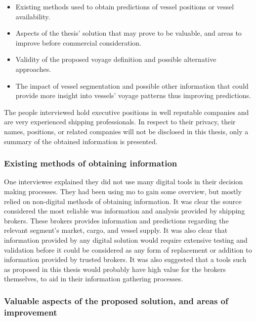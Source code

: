\begin{itemize}
    \item Existing methods used to obtain predictions of vessel positions or vessel availability.
    \item Aspects of the thesis' solution that may prove to be valuable, and areas to improve before commercial consideration.
    \item Validity of the proposed voyage definition and possible alternative approaches.
    \item The impact of vessel segmentation and possible other information that could provide more insight into vessels' voyage patterns thus improving predictions.
\end{itemize}

The people interviewed hold executive positions in well reputable companies and are very experienced shipping professionals. In respect to their privacy, their names, positions, or related companies will not be disclosed in this thesis, only a summary of the obtained information is presented.

\subsubsection{Existing methods of obtaining information}

One interviewee explained they did not use many digital tools in their decision making processes. They had been using \acrfull{mo} to gain some overview, but mostly relied on non-digital methods of obtaining information. It was clear the source considered the most reliable was information and analysis provided by shipping brokers. These brokers provides information and predictions regarding the relevant segment's market, cargo, and vessel supply. It was also clear that information provided by any digital solution would require extensive testing and validation before it could be considered as any form of replacement or addition to information provided by trusted brokers. It was also suggested that a tools such as proposed in this thesis would probably have high value for the brokers themselves, to aid in their information gathering processes.

\subsubsection{Valuable aspects of the proposed solution, and areas of improvement}

